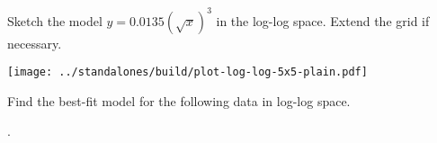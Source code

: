 \documentclass[../main.tex]{subfiles}
\begin{document}
\begin{example}
  Sketch the model \(y = 0.0135 (\sqrt{x})^{3}\) in the log-log space.  Extend the grid if necessary.

  \begin{center}
    \texttt{[image: ../standalones/build/plot-log-log-5x5-plain.pdf]}
  \end{center}

\end{example}

\begin{example}
  Find the best-fit model for the following data in log-log space.

  .
\end{example}
\end{document}

